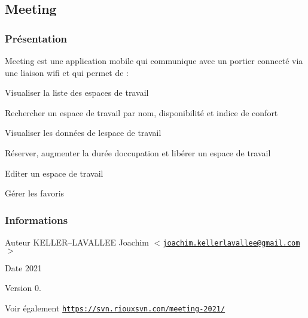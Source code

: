 \hypertarget{page__r_e_a_d_m_e_projet}{}\subsection{Meeting}\label{page__r_e_a_d_m_e_projet}
\hypertarget{page__r_e_a_d_m_e_presentation}{}\subsubsection{Présentation}\label{page__r_e_a_d_m_e_presentation}
Meeting est une application mobile qui communique avec un portier connecté via une liaison wifi et qui permet de \+:


\begin{DoxyItemize}
\item Visualiser la liste des espaces de travail
\item Rechercher un espace de travail par nom, disponibilité et indice de confort
\item Visualiser les données de l\textquotesingle{}espace de travail
\item Réserver, augmenter la durée d\textquotesingle{}occupation et libérer un espace de travail
\item Editer un espace de travail
\item Gérer les favoris
\end{DoxyItemize}\hypertarget{page__r_e_a_d_m_e_informations}{}\subsubsection{Informations}\label{page__r_e_a_d_m_e_informations}
\begin{DoxyAuthor}{Auteur}
K\+E\+L\+L\+ER--L\+A\+V\+A\+L\+L\+EE Joachim $<$\href{mailto:joachim.kellerlavallee@gmail.com}{\tt joachim.\+kellerlavallee@gmail.\+com}$>$ 
\end{DoxyAuthor}
\begin{DoxyDate}{Date}
2021 
\end{DoxyDate}
\begin{DoxyVersion}{Version}
0. 
\end{DoxyVersion}
\begin{DoxySeeAlso}{Voir également}
\href{https://svn.riouxsvn.com/meeting-2021/}{\tt https\+://svn.\+riouxsvn.\+com/meeting-\/2021/} 
\end{DoxySeeAlso}
